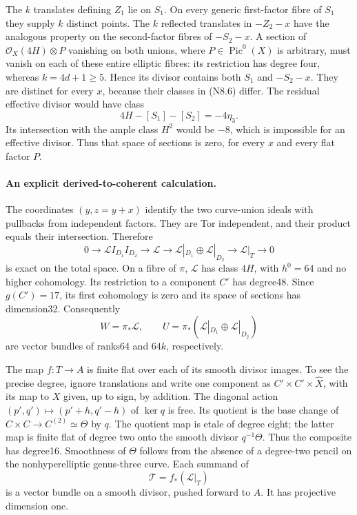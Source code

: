 The $k$ translates defining $Z_1$ lie on $S_1$. On every generic
first-factor fibre of $S_1$ they supply $k$ distinct points.
The $k$ reflected translates in $-Z_2-x$ have the analogous
property on the second-factor fibres of $-S_2-x$. A section of
$\mathcal O_X(4H)\otimes P$ vanishing on both unions, where
$P\in\operatorname{Pic}^0(X)$ is arbitrary, must vanish on each
of these entire elliptic fibres: its restriction has degree four,
whereas $k=4d+1\ge5$. Hence its divisor contains both $S_1$ and
$-S_2-x$. They are distinct for every $x$, because their classes
in (N8.6) differ. The residual effective divisor would have class
\[
 4H-[S_1]-[S_2]=-4\eta_3.
\]
Its intersection with the ample class $H^2$ would be $-8$, which
is impossible for an effective divisor. Thus that space of
sections is zero, for every $x$ and every flat factor $P$.

\paragraph{An explicit derived-to-coherent calculation.}
The coordinates $(y,z=y+x)$ identify the two curve-union ideals
with pullbacks from independent factors. They are Tor independent,
and their product equals their intersection. Therefore
\[
 0\to\mathcal L I_{D_1}I_{D_2}\to\mathcal L
 \to\mathcal L|_{D_1}\oplus\mathcal L|_{D_2}
 \to\mathcal L|_T\to0                                    \tag{N8.7}
\]
is exact on the total space.
On a fibre of $\pi$, $\mathcal L$ has class $4H$, with
$h^0=64$ and no higher cohomology. Its restriction to a component
$C'$ has degree48. Since $g(C')=17$, its first cohomology is zero
and its space of sections has dimension32. Consequently
\[
 W=\pi_*\mathcal L,\qquad
 U=\pi_*(\mathcal L|_{D_1}\oplus\mathcal L|_{D_2})
\]
are vector bundles of ranks64 and $64k$, respectively.

The map $f:T\to A$ is finite flat over each of its smooth divisor
images. To see the precise degree, ignore translations and write
one component as $C'\times C'\times\widehat X$, with its map to
$X$ given, up to sign, by addition. The diagonal action
$(p',q')\mapsto(p'+h,q'-h)$ of $\ker q$ is free. Its quotient is
the base change of $C\times C\to C^{(2)}\simeq\Theta$ by $q$.
The quotient map is etale of degree eight; the latter map is
finite flat of degree two onto the smooth divisor $q^{-1}\Theta$.
Thus the composite has degree16. Smoothness of $\Theta$ follows
from the absence of a degree-two pencil on the nonhyperelliptic
genus-three curve. Each summand of
\[
 \mathcal T=f_*(\mathcal L|_T)
\]
is a vector bundle on a smooth divisor, pushed forward to $A$.
It has projective dimension one.

